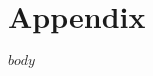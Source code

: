 \hypertarget{appendix}{%
\chapter{Appendix}\label{appendix}}

\begingroup
  \scriptsize
  \setlength{\LTpost}{0pt}

  \renewcommand\subsection{\headingcommand{subsection}{2}{\large}}
  \renewcommand\subsubsection{\headingcommand{subsubsection}{3}{\normalsize}}
  \renewcommand\paragraph{\headingcommand{paragraph}{4}{\normalsize}}
  \renewcommand\subparagraph{\headingcommand{subparagraph}{5}{\normalsize}}

  $body$
\endgroup

\newpage
{}
{}
